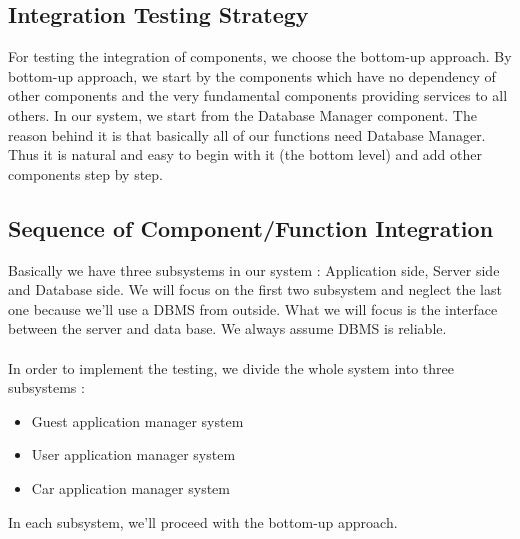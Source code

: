 \documentclass{article}
\begin{document}
 \subsection{Integration Testing Strategy}
 For testing the integration of components, we choose the bottom-up approach. By bottom-up approach, we start by the components which have no dependency of other components and the very fundamental components providing services to all others. In our system, we start from the Database Manager component. The reason behind it is that basically all of our functions need Database Manager. Thus it is natural and easy to begin with it (the bottom level) and add other components step by step. 
 \subsection{Sequence of Component/Function Integration}
 Basically we have three subsystems in our system : Application side, Server side and Database side. We will focus on the first two subsystem and neglect the last one because we'll use a DBMS from outside. What we will focus is the interface between the server and data base. We always assume DBMS is reliable.\\
 \\
 In order to implement the testing, we divide the whole system into three subsystems :
 \begin{itemize}
 	\item Guest application manager system
 	\item User application manager system
 	\item Car application manager system
 \end{itemize}
In each subsystem, we'll proceed with the bottom-up approach.
\end{document}
